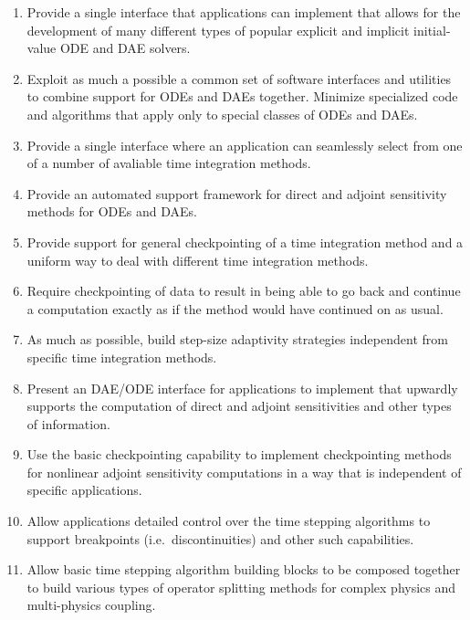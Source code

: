 \documentclass[pdf,ps2pdf,11pt]{SANDreport}
\begin{document}
\begin{enumerate}

{}\item Provide a single interface that applications can implement that allows
for the development of many different types of popular explicit and implicit
initial-value ODE and DAE solvers.

{}\item Exploit as much a possible a common set of software interfaces and
utilities to combine support for ODEs and DAEs together.  Minimize specialized
code and algorithms that apply only to special classes of ODEs and DAEs.

{}\item Provide a single interface where an application can seamlessly select
from one of a number of avaliable time integration methods.

{}\item Provide an automated support framework for direct and adjoint
sensitivity methods for ODEs and DAEs.

{}\item Provide support for general checkpointing of a time integration method
and a uniform way to deal with different time integration methods.

{}\item Require checkpointing of data to result in being able to go back and
continue a computation exactly as if the method would have continued on as
usual.

{}\item As much as possible, build step-size adaptivity strategies independent
from specific time integration methods.

{}\item Present an DAE/ODE interface for applications to implement that
upwardly supports the computation of direct and adjoint sensitivities and
other types of information.

{}\item Use the basic checkpointing capability to implement checkpointing
methods for nonlinear adjoint sensitivity computations in a way that is
independent of specific applications.

{}\item Allow applications detailed control over the time stepping algorithms
to support breakpoints (i.e.\ discontinuities) and other such capabilities.

{}\item Allow basic time stepping algorithm building blocks to be composed
together to build various types of operator splitting methods for complex
physics and multi-physics coupling.

\end{enumerate}
\end{document}
